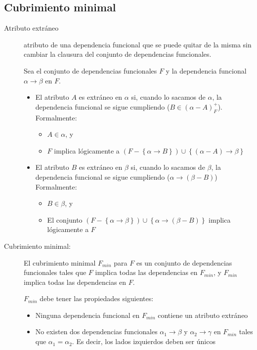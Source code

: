 \documentclass[a4paper, twoside]{article}
\begin{document}
\subsection{Cubrimiento minimal}
\begin{description}
	\item[Atributo extráneo] atributo de una dependencia funcional que se puede quitar de la misma sin cambiar\emph{ }la clausura del conjunto de dependencias funcionales. 

	Sea el conjunto de dependencias funcionales $F$ y la dependencia funcional $\alpha\to\beta$ en $F$.
	\begin{itemize}
		\item El atributo $A$ es extráneo en $\alpha$ si, cuando lo sacamos de $\alpha$, la dependencia funcional se sigue cumpliendo ($B\in(\alpha-A)_{F}^{+}$). Formalmente:
		\begin{itemize}
			\item $A\in\alpha$, y
			\item $F$ implica lógicamente a $\left(F-\left\{ \alpha\to B\right\} \right)\cup\left\{ \left(\alpha-A\right)\to\beta\right\} $
		\end{itemize}

		\item El atributo $B$ es extráneo en $\beta$ si, cuando lo sacamos de $\beta$, la dependencia funcional se sigue cumpliendo ($\alpha\to(\beta-B)$) Formalmente:
		\begin{itemize}
			\item $B\in\beta$, y
			\item El conjunto $\left(F-\left\{ \alpha\to\beta\right\} \right)\cup\left\{ \alpha\to\left(\beta-B\right)\right\}$ implica lógicamente a $F$
		\end{itemize}
	\end{itemize}

	\item[Cubrimiento minimal:] El cubrimiento minimal $F_{min}$ para $F$ es un conjunto de dependencias funcionales tales que $F$ implica todas las dependencias en $F_{min}$, y $F_{min}$ implica todas las
dependencias en $F$.

	$F_{min}$ debe tener las propiedades siguientes:
	\begin{itemize}
		\item Ninguna dependencia funcional en $F_{min}$ contiene un atributo extráneo
		\item No existen dos dependencias funcionales $\alpha_{1}\to\beta$ y $\alpha_{2}\to\gamma$ en $F_{min}$ tales que $\alpha_{1}=\alpha_{2}$. Es decir, los lados izquierdos deben ser únicos
	\end{itemize}
\end{description}
\end{document}
